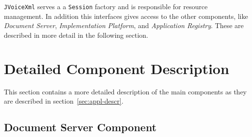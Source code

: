 \documentclass[11pt,a4paper]{article}
\begin{document}
\begin{center}
\end{center}


\texttt{JVoiceXml} serves a a \texttt{Session} factory and is responsible
for resource management. In addition this interfaces gives access to the other
components, like \emph{Document Server}, \emph{Implementation Platform}, and
\emph{Application Registry}. These are described in more detail in the following
section.

\section{Detailed Component Description}
\label{sec:deta-comp-descr}

This section contains a more detailed description of the main components as they
are described in section~\ref{sec:appl-descr}.

\subsection{Document Server Component}
\label{sec:docum-serv-comp}
\end{document}
